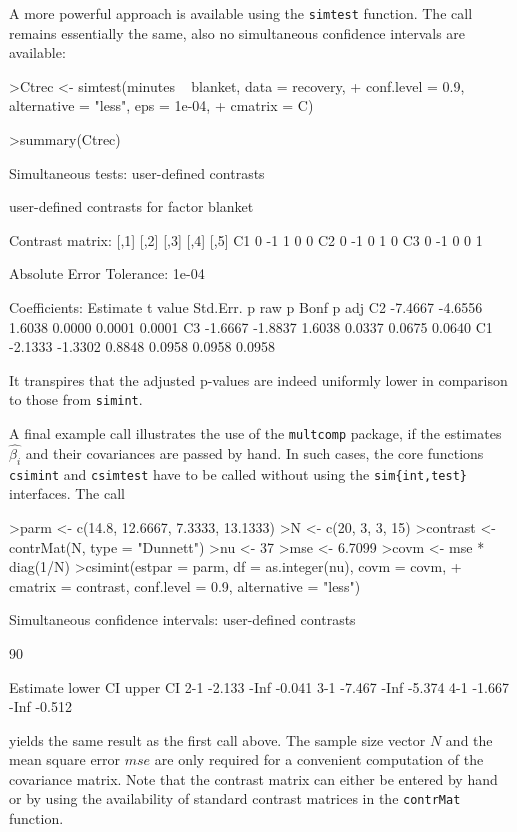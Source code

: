 \documentclass{article}
\begin{document}
A more powerful approach is available using the \texttt{simtest}
function. The call remains essentially the same, also no simultaneous confidence intervals are available:
\small
\begin{Sinput}
>Ctrec <- simtest(minutes ~ blanket, data = recovery, 
+     conf.level = 0.9, alternative = "less", eps = 1e-04, 
+     cmatrix = C)
\end{Sinput}
\begin{Sinput}
>summary(Ctrec)
\end{Sinput}
\begin{Soutput}
	 Simultaneous tests: user-defined contrasts 

	 user-defined contrasts for factor blanket

Contrast matrix:
   [,1] [,2] [,3] [,4] [,5]
C1    0   -1    1    0    0
C2    0   -1    0    1    0
C3    0   -1    0    0    1


Absolute Error Tolerance:  1e-04 

Coefficients:
   Estimate t value Std.Err.  p raw p Bonf  p adj
C2  -7.4667 -4.6556   1.6038 0.0000 0.0001 0.0001
C3  -1.6667 -1.8837   1.6038 0.0337 0.0675 0.0640
C1  -2.1333 -1.3302   0.8848 0.0958 0.0958 0.0958
\end{Soutput}
\normalsize
It transpires that the adjusted p-values are indeed
uniformly lower in comparison to those from \texttt{simint}.

A final example call illustrates the use of the \texttt{multcomp} package, if the
estimates $\hat{\beta_i}$ and their covariances are passed by
hand. In such cases, the core functions \texttt{csimint} and
\texttt{csimtest} have to be called without using the
\texttt{sim\{int,test\}} interfaces. The call 
\small
\begin{Sinput}
>parm <- c(14.8, 12.6667, 7.3333, 13.1333)
>N <- c(20, 3, 3, 15)
>contrast <- contrMat(N, type = "Dunnett")
>nu <- 37
>mse <- 6.7099
>covm <- mse * diag(1/N)
>csimint(estpar = parm, df = as.integer(nu), covm = covm, 
+     cmatrix = contrast, conf.level = 0.9, alternative = "less")
\end{Sinput}
\begin{Soutput}
	Simultaneous confidence intervals: user-defined
	contrasts

	90 % confidence intervals

    Estimate lower CI upper CI
2-1   -2.133     -Inf   -0.041
3-1   -7.467     -Inf   -5.374
4-1   -1.667     -Inf   -0.512
\end{Soutput}
\normalsize 
yields the same result as the first call above. The
sample size vector $N$ and the mean square error $mse$ are only
required for a convenient computation of the covariance matrix.
Note that the contrast matrix can either be entered by hand or by
using the availability of standard contrast matrices in the
\texttt{contrMat} function.
\end{document}
